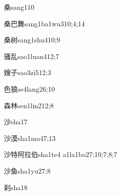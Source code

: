 \begin{verbete}{桑}{sang1}{10}
\end{verbete}

\begin{verbete}{桑巴舞}{sang1ba1wu3}{10;4;14}
\end{verbete}

\begin{verbete}{桑树}{sang1shu4}{10;9}
\end{verbete}

\begin{verbete}{骚乱}{sao1luan4}{12;7}
\end{verbete}

\begin{verbete}{嫂子}{sao3zi5}{12;3}
\end{verbete}

\begin{verbete}{色狼}{se4lang2}{6;10}
\end{verbete}

\begin{verbete}{森林}{sen1lin2}{12;8}
\end{verbete}

\begin{verbete}{沙}{sha1}{7}
\end{verbete}

\begin{verbete}{沙漠}{sha1mo4}{7;13}
\end{verbete}

\begin{verbete}{沙特阿拉伯}{sha1te4 a1la1bo2}{7;10;7;8;7}
\end{verbete}

\begin{verbete}{沙鱼}{sha1yu2}{7;8}
\end{verbete}

\begin{verbete}{刹}{sha1}{8}
\end{verbete}

